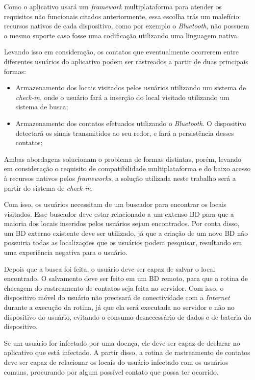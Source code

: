 Como o aplicativo usará um \textit{framework} multiplataforma para atender os requisitos não funcionais citados anteriormente, essa escolha trás um malefício: recursos nativos de cada dispositivo, como por exemplo o \textit{Bluetooth}, não possuem o mesmo suporte caso fosse uma codificação utilizando uma linguagem nativa.

Levando isso em consideração, os contatos que eventualmente ocorrerem entre diferentes usuários do aplicativo podem ser rastreados a partir de duas principais formas: 

\begin{itemize}
  \item Armazenamento dos locais visitados pelos usuários utilizando um sistema de \textit{check-in}, onde o usuário fará a inserção do local visitado utilizando um sistema de busca;
  \item Armazenamento dos contatos efetuados utilizando o \textit{Bluetooth}. O dispositivo detectará os sinais transmitidos ao seu redor, e fará a persistência desses contatos;
\end{itemize}

Ambas abordagens solucionam o problema de formas distintas, porém, levando em consideração o requisito de compatibilidade multiplataforma e do baixo acesso à recursos nativos pelos \textit{frameworks}, a solução utilizada neste trabalho será a partir do sistema de \textit{check-in}.

Com isso, os usuários necessitam de um buscador para encontrar os locais visitados. Esse buscador deve estar relacionado a um extenso BD para que a maioria dos locais inseridos pelos usuários sejam encontrados. Por conta disso, um BD externo existente deve ser utilizado, já que a criação de um novo BD não possuiria todas as localizações que os usuários podem pesquisar, resultando em uma experiência negativa para o usuário.

Depois que a busca foi feita, o usuário deve ser capaz de salvar o local encontrado. O salvamento deve ser feito em um BD remoto, para que a rotina de checagem do rastreamento de contatos seja feita no servidor. Com isso, o dispositivo móvel do usuário não precisará de conectividade com a \textit{Internet} durante a execução da rotina, já que ela será executada no servidor e não no dispositivo do usuário, evitando o consumo desnecessário de dados e de bateria do dispositivo.

Se um usuário for infectado por uma doença, ele deve ser capaz de declarar no aplicativo que está infectado. A partir disso, a rotina de rastreamento de contatos deve ser capaz de relacionar os locais do usuário infectado com os usuários comuns, procurando por algum possível contato que possa ter ocorrido.

